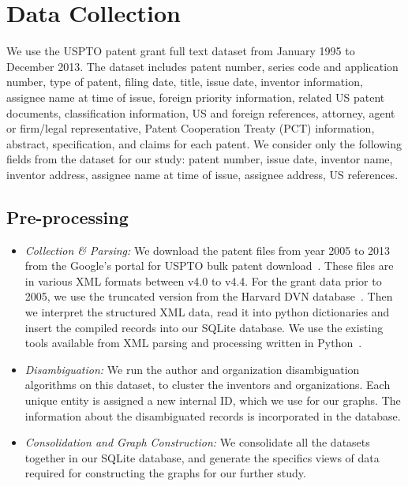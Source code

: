 \section{Data Collection}

We use the USPTO patent grant full text dataset from January 1995 to December 
2013.  The dataset includes patent number, series code and application number,
type of patent, filing date, title, issue date, inventor information, assignee
name at time of issue, foreign priority information, related US patent
documents, classification information, US and foreign references, attorney,
agent or firm/legal representative, Patent Cooperation Treaty (PCT)
information, abstract, specification, and claims for each patent. We consider
only the following fields from the dataset for our study: patent number, issue
date, inventor name, inventor address, assignee name at time of issue, assignee address, US
references. 


\subsection{Pre-processing}

\begin{itemize}
\squish
\item {\em Collection \& Parsing:} We download the patent files from year 2005 to 2013 from the Google's portal for USPTO bulk patent download~\cite{usptodb}. These files are in various XML formats between v4.0 to v4.4. For the grant data prior to 2005, we use the truncated version from the Harvard DVN database~\cite{dvn}. Then we interpret the structured XML data, read it into python dictionaries and insert the compiled records into our SQLite database. We use the existing tools available from XML parsing and processing written in Python~\cite{newparser, formattingpatentdata, fungpaper}. 

\item {\em Disambiguation:} We run the author and organization disambiguation algorithms on this dataset, to cluster the inventors and organizations. Each unique entity is assigned a new internal ID, which we use for our graphs. The information about the disambiguated records is incorporated in the database. 

\item {\em Consolidation and Graph Construction:} 
We consolidate all the datasets together in our SQLite database, and generate the specifics views of data required for constructing the graphs for our further study.
\end{itemize}

